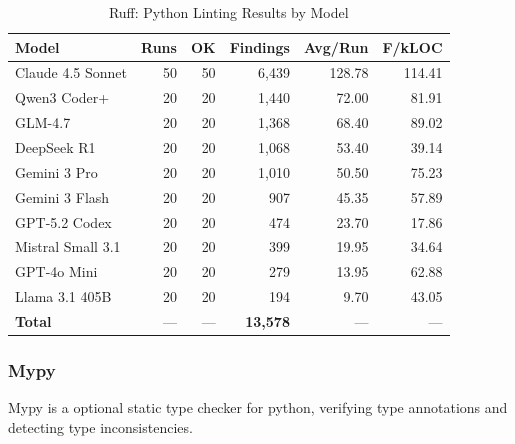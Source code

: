 \begin{table}[htbp]
    \centering
    \caption{Ruff: Python Linting Results by Model}
    \label{tab:tool_ruff}
    \small
    \begin{tabular}{@{} l r r r r r @{}}
        \toprule
        \textbf{Model} & \textbf{Runs} & \textbf{OK} & \textbf{Findings} & \textbf{Avg/Run} & \textbf{F/kLOC} \\
        \midrule
        Claude 4.5 Sonnet & 50 & 50 & 6{,}439 & 128.78 & 114.41 \\
        Qwen3 Coder+ & 20 & 20 & 1{,}440 & 72.00 & 81.91 \\
        GLM-4.7 & 20 & 20 & 1{,}368 & 68.40 & 89.02 \\
        DeepSeek R1 & 20 & 20 & 1{,}068 & 53.40 & 39.14 \\
        Gemini 3 Pro & 20 & 20 & 1{,}010 & 50.50 & 75.23 \\
        Gemini 3 Flash & 20 & 20 & 907 & 45.35 & 57.89 \\
        GPT-5.2 Codex & 20 & 20 & 474 & 23.70 & 17.86 \\
        Mistral Small 3.1 & 20 & 20 & 399 & 19.95 & 34.64 \\
        GPT-4o Mini & 20 & 20 & 279 & 13.95 & 62.88 \\
        Llama 3.1 405B & 20 & 20 & 194 & 9.70 & 43.05 \\
        \midrule
        \textbf{Total} & --- & --- & \textbf{13{,}578} & --- & --- \\
        \bottomrule
    \end{tabular}
\end{table}

\subsubsection{Mypy}

Mypy is a optional static type checker for python, verifying type annotations and detecting type inconsistencies.

